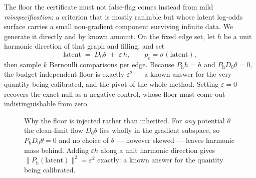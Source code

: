 \documentclass[11pt,a4paper]{article}
\newcommand{\Ph}{P_{\mathrm{h}}}
\begin{document}
The floor the certificate must not false-flag comes instead from mild
\emph{misspecification}: a criterion that is mostly rankable but whose latent
log-odds surface carries a small non-gradient component surviving infinite data.
We generate it directly and by known amount. On the fixed edge set, let $h$ be a
unit harmonic direction of that graph and filling, and set
\begin{equation}
\text{latent} \;=\; D_0\theta \;+\; \varepsilon\, h ,
\qquad p_e = \sigma(\text{latent}),
\label{eq:inject}
\end{equation}
then sample $k$ Bernoulli comparisons per edge. Because $\Ph h = h$ and
$\Ph D_0\theta = 0$, the budget-independent floor is exactly $\varepsilon^2$ ---
a known answer for the very quantity being calibrated, and the pivot of the whole
method. Setting $\varepsilon=0$ recovers the exact null as a negative control,
whose floor must come out indistinguishable from zero.

\begin{figure}[h]
\centering
{}
\caption{Why the floor is injected rather than inherited. For \emph{any}
potential $\theta$ the clean-limit flow $D_0\theta$ lies wholly in the gradient
subspace, so $\Ph D_0\theta = 0$ and no choice of $\theta$ --- however skewed
--- leaves harmonic mass behind. Adding $\varepsilon h$ along a unit harmonic
direction gives $\|\Ph(\text{latent})\|^2 = \varepsilon^2$ exactly: a known
answer for the quantity being calibrated.\label{fig:inject}}
\end{figure}
\end{document}
